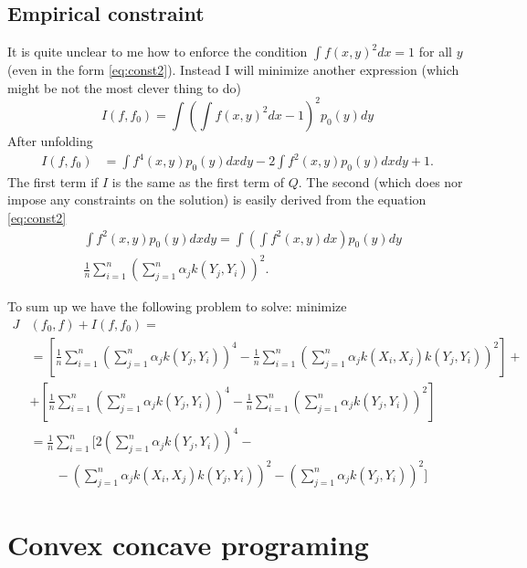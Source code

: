 \documentclass[10pt]{article}
\begin{document}
\subsection{Empirical constraint}
It is quite unclear to me how to enforce the condition $\int f(x,y)^2dx =1$ for all $y$ (even in the form \eqref{eq:const2}). Instead I will minimize another expression (which might be not the most clever thing to do)
\begin{equation}
 I(f,f_0) = \int \left( \int f(x,y)^2 dx -1 \right)^2 p_0(y) dy
\end{equation}
After unfolding
\begin{align}
 I(f,f_0) &= \int f^4(x,y) p_0(y) dx dy - 2 \int f^2(x,y) p_0(y) dx dy +1.
\end{align}
The first term if $I$ is the same as the first term of $Q$. The second (which does nor impose any constraints on the solution) is easily derived from the equation \eqref{eq:const2} 
\begin{align}
 &\int f^2(x,y) p_0(y) dx dy =  \int \left ( \int f^2(x,y) dx \right ) p_0(y)  dy\\ 
 &\frac 1 n \sum_{i=1}^n \left( \sum_{j=1}^{n} \alpha_j    k(Y_{j},Y_i) \right )^2 .
\end{align}

To sum up we have the following problem to solve: minimize 
\begin{align}
 J&(f_0,f) +I(f,f_0) = \\
 &=\left[  \frac 1 n \sum_{i=1}^{n} \left( \sum_{j=1}^{n} \alpha_j k(Y_j,Y_i)  \right)^4 - \frac 1 n \sum_{i=1}^n \left( \sum_{j=1}^{n} \alpha_j k(X_i,X_j) k(Y_j,Y_i) \right)^2 \right] + \\
 &+ \left[  \frac 1 n \sum_{i=1}^{n} \left( \sum_{j=1}^{n} \alpha_j k(Y_j,Y_i)  \right)^4 - \frac 1 n \sum_{i=1}^n \left( \sum_{j=1}^{n} \alpha_j    k(Y_{j},Y_i) \right )^2 \right] \\
 &=  \frac 1 n \sum_{i=1}^{n}   \Bigg [ 2 \left( \sum_{j=1}^{n} \alpha_j k(Y_j,Y_i)  \right)^4 - \\
  & \quad \quad -\left( \sum_{j=1}^{n} \alpha_j k(X_i,X_j) k(Y_j,Y_i) \right)^2 - \left( \sum_{j=1}^{n} \alpha_j    k(Y_{j},Y_i) \right )^2 \Bigg]   
\end{align}

\section{Convex concave programing}
\end{document}
